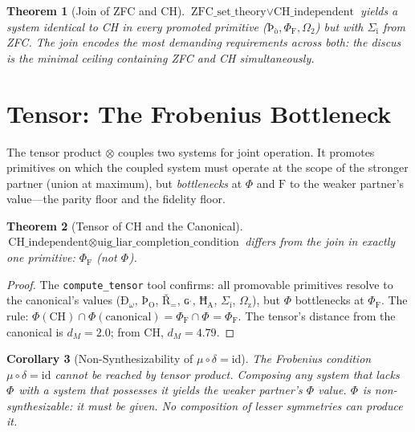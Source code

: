 \documentclass[12pt,twoside]{book}
\newtheorem{theorem}{Theorem}[chapter]
\newtheorem{corollary}[theorem]{Corollary}
\theoremstyle{definition}
\newcommand{\moebius}{\mu \circ \delta = \text{id}}
\newcommand{\prim}[1]{\text{#1}}
\begin{document}
\begin{theorem}[Join of ZFC and CH]
$\text{ZFC\_set\_theory} \vee \text{CH\_independent}$ yields a system identical to CH in every promoted primitive ($\text{Þ}_{\text{ò}}, \Phi_{\text{F}}, \Omega_{\text{2}}$) but with $\Sigma_{\text{ï}}$ from ZFC. The join encodes the most demanding requirements across both: the discus is the minimal ceiling containing ZFC and CH simultaneously.
\end{theorem}

\section{Tensor: The Frobenius Bottleneck}

The tensor product $\otimes$ couples two systems for joint operation. It promotes primitives on which the coupled system must operate at the scope of the stronger partner (union at maximum), but \emph{bottlenecks} at $\Phi$ and $\prim{F}$ to the weaker partner's value---the parity floor and the fidelity floor.

\begin{theorem}[Tensor of CH and the Canonical]
$\text{CH\_independent} \otimes \text{uig\_liar\_completion\_condition}$ differs from the join in exactly one primitive: $\Phi_{\text{F}}$ (not $\Phi_{\text{}}$).
\end{theorem}

\begin{proof}
The \texttt{compute\_tensor} tool confirms: all promovable primitives resolve to the canonical's values ($\text{Ð}_{\omega}$, $\text{Þ}_{\text{O}}$, $\text{Ř}_{\text{=}}$, $\text{ɢ}^{\text{ˌ}}$, $\text{Ħ}_{\text{A}}$, $\Sigma_{\text{ï}}$, $\Omega_{\text{z}}$), but $\Phi$ bottlenecks at $\Phi_{\text{F}}$. The rule: $\Phi(\text{CH}) \cap \Phi(\text{canonical}) = \Phi_{\text{F}} \cap \Phi_{\text{}} = \Phi_{\text{F}}$. The tensor's distance from the canonical is $d_M = 2.0$; from CH, $d_M = 4.79$.
\end{proof}

\begin{corollary}[Non-Synthesizability of $\moebius$]
The Frobenius condition $\moebius$ cannot be reached by tensor product. Composing any system that lacks $\Phi_{\text{}}$ with a system that possesses it yields the weaker partner's $\Phi$ value. $\Phi_{\text{}}$ is non-synthesizable: it must be \emph{given}. No composition of lesser symmetries can produce it.
\end{corollary}
\end{document}
